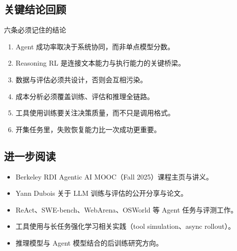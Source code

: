 \documentclass[a4paper]{article}
\begin{document}
\subsection{关键结论回顾}
\begin{importantbox}{六条必须记住的结论}
\begin{enumerate}
    \item Agent 成功率取决于系统协同，而非单点模型分数。
    \item Reasoning RL 是连接文本能力与执行能力的关键桥梁。
    \item 数据与评估必须共设计，否则会互相污染。
    \item 成本分析必须覆盖训练、评估和推理全链路。
    \item 工具使用训练要关注决策质量，而不只是调用格式。
    \item 开集任务里，失败恢复能力比一次成功更重要。
\end{enumerate}
\end{importantbox}

\subsection{进一步阅读}
\begin{itemize}
    \item Berkeley RDI Agentic AI MOOC（Fall 2025）课程主页与讲义。
    \item Yann Dubois 关于 LLM 训练与评估的公开分享与论文。
    \item ReAct、SWE-bench、WebArena、OSWorld 等 Agent 任务与评测工作。
    \item 工具使用与长任务强化学习相关实践（tool simulation、async rollout）。
    \item 推理模型与 Agent 模型结合的后训练研究方向。
\end{itemize}
\end{document}
